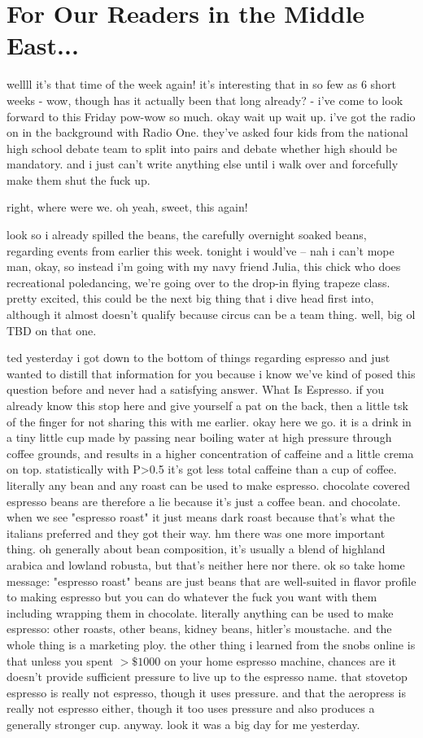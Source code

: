 \documentclass[12pt]{article}
\begin{document}
\newpage

\section*{For Our Readers in the Middle East...}
wellll it's that time of the week again! it's interesting that in so few as 6 short weeks - wow, though has it actually been that long already? - i've come to look forward to this Friday pow-wow so much. okay wait up wait up. i've got the radio on in the background with Radio One. they've asked four kids from the national high school debate team to split into pairs and debate whether high should be mandatory. and i just can't write anything else until i walk over and forcefully make them shut the fuck up.

right, where were we. oh yeah, sweet, this again!

look so i already spilled the beans, the carefully overnight soaked beans, regarding events from earlier this week. tonight i would've -- nah i can't mope man, okay, so instead i'm going with my navy friend Julia, this chick who does recreational poledancing, we're going over to the drop-in flying trapeze class. pretty excited, this could be the next big thing that i dive head first into, although it almost doesn't qualify because circus can be a team thing. well, big ol TBD on that one.

ted yesterday i got down to the bottom of things regarding espresso and just wanted to distill that information for you because i know we've kind of posed this question before and never had a satisfying answer. What Is Espresso. if you already know this stop here and give yourself a pat on the back, then a little tsk of the finger for not sharing this with me earlier. okay here we go. it is a drink in a tiny little cup made by passing near boiling water at high pressure through coffee grounds, and results in a higher concentration of caffeine and a little crema on top. statistically with P>0.5 it's got less total caffeine than a cup of coffee. literally any bean and any roast can be used to make espresso. chocolate covered espresso beans are therefore a lie because it's just a coffee bean. and chocolate. when we see "espresso roast" it just means dark roast because that's what the italians preferred and they got their way. hm there was one more important thing. oh generally about bean composition, it's usually a blend of highland arabica and lowland robusta, but that's neither here nor there. ok so take home message: "espresso roast" beans are just beans that are well-suited in flavor profile to making espresso but you can do whatever the fuck you want with them including wrapping them in chocolate. literally anything can be used to make espresso: other roasts, other beans, kidney beans, hitler's moustache. and the whole thing is a marketing ploy. the other thing i learned from the snobs online is that unless you spent $>\$1000$ on your home espresso machine, chances are it doesn't provide sufficient pressure to live up to the espresso name. that stovetop espresso is really not espresso, though it uses pressure. and that the aeropress is really not espresso either, though it too uses pressure and also produces a generally stronger cup. anyway. look it was a big day for me yesterday.
\end{document}
